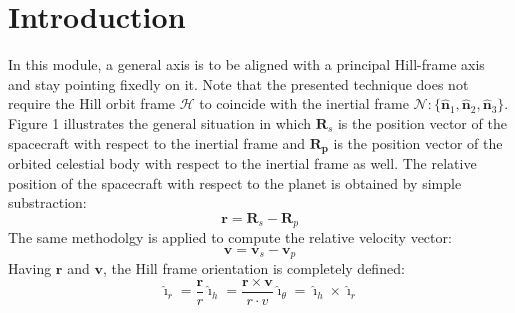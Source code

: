 \documentclass[]{AVSSimReportMemo}
\begin{document}
\section{Introduction}
In this module, a general axis is to be aligned with a principal Hill-frame axis and stay pointing fixedly on it. Note that the presented technique does not require the Hill orbit frame $\mathcal{H}$ to coincide with the inertial frame $\mathcal{N}:\{ \hat{\bm n}_{1}, \hat{\bm n}_{2}, \hat{\bm n}_{3} \}$. Figure 1 illustrates the general situation in which $\bm{R}_{s}$ is the position vector of the spacecraft with respect to the inertial frame and $\bm{R_{p}}$ is the position vector of the orbited celestial body with respect to the inertial frame as well.
The relative position of the spacecraft with respect to the planet is obtained by simple substraction:
\begin{equation}
	\label{eq:r}
	\bm r = \bm R_{s} -  \bm R_{p}
\end{equation}
The same methodolgy is applied to compute the relative velocity vector:
\begin{equation}
	\label{eq:v}
	\bm v = \bm v_{s} -  \bm v_{p}
\end{equation}
Having $\bm r$ and $\bm v$, the Hill frame orientation is completely defined:
\begin{subequations}
	\begin{equation}
	\hat{\bm\imath}_{r} = \frac{\bm r}{r} 
	\end{equation}
	\begin{equation}
	\hat{\bm\imath}_{h} = \frac{\bm{r}\times{\bm{v}}}{r · v}
	\end{equation}
	\begin{equation}
	\hat{\bm\imath}_{\theta} = \hat{\bm\imath}_{h} \times \hat{\bm\imath}_{r}
	\end{equation}
\end{subequations}
\end{document}
